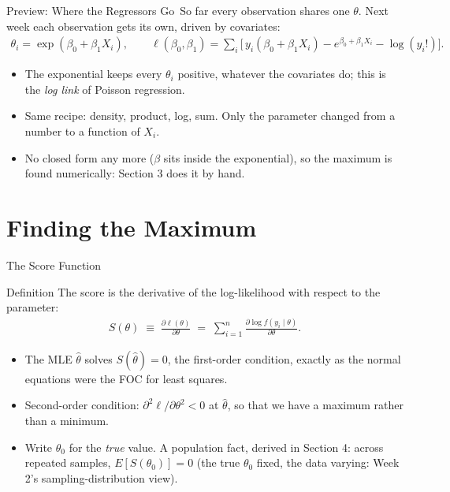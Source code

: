 \documentclass[aspectratio=169,11pt,xcolor=dvipsnames]{beamer}
\newcommand{\E}{E}
\newcommand{\loglik}{\ell}
\newcommand{\core}{\,\raisebox{0.6pt}{\textcolor{corestar}{$\bigstar$}}}
\begin{document}
\begin{frame}{Preview: Where the Regressors Go\core}
So far every observation shares one $\theta$. Next week each observation
gets its own, driven by covariates:
\begin{align*}
  \theta_i = \exp(\beta_0 + \beta_1 X_i),
  \qquad
  \loglik(\beta_0,\beta_1) = \sum_i \Big[\, y_i(\beta_0 + \beta_1 X_i)
  - e^{\beta_0 + \beta_1 X_i} - \log(y_i!)\Big] .
\end{align*}
\begin{itemize}\itemsep3pt
  \item The exponential keeps every $\theta_i$ positive, whatever the
        covariates do; this is the \emph{log link} of Poisson regression.
  \item Same recipe: density, product, log, sum. Only the parameter changed
        from a number to a function of $X_i$.
  \item No closed form any more ($\beta$ sits inside the exponential), so
        the maximum is found numerically: Section 3 does it by hand.
\end{itemize}
\end{frame}

\section[Finding the MLE]{Finding the Maximum}
\begin{frame}\sectionpage\end{frame}

\begin{frame}{The Score Function\core}
\begin{block}{Definition}
The \alert{score} is the derivative of the log-likelihood with respect to the
parameter:
\begin{align*}
  S(\theta) \;\equiv\; \frac{\partial \loglik(\theta)}{\partial\theta}
  \;=\; \sum_{i=1}^{n} \frac{\partial \log f(y_i\mid\theta)}{\partial \theta} .
\end{align*}
\end{block}
\vskip4pt
\begin{itemize}\itemsep3pt
  \item The MLE $\hat\theta$ solves $S(\hat\theta) = 0$, the
        \alert{first-order condition}, exactly as the normal equations were the
        FOC for least squares.
  \item Second-order condition: $\partial^2\loglik/\partial\theta^2 < 0$ at
        $\hat\theta$, so that we have a maximum rather than a minimum.
  \item Write $\theta_0$ for the \emph{true} value. A population fact,
        derived in Section 4: across repeated samples, $\E[S(\theta_0)] = 0$
        (the true $\theta_0$ fixed, the data varying: Week 2's
        sampling-distribution view).
\end{itemize}
\end{frame}
\end{document}
